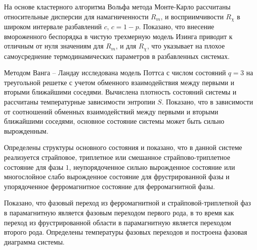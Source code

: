

На основе кластерного алгоритма Вольфа метода Монте-Карло рассчитаны относительные дисперсии для намагниченности $R_m$, и восприимчивости $R_\chi$ в широком интервале разбавлений $c$, $c=1-p$.
Показано, что внесение вмороженного беспорядка в чистую трехмерную модель Изинга приводит к отличным от нуля значениям для $R_m$, и для $R_\chi$, что указывает на плохое самоусреднение термодинамических параметров в разбавленных системах.


Методом Ванга -- Ландау исследована модель Поттса с числом состояний $q=3$ на треугольной решетке с учетом обменного взаимодействия между первыми и вторыми ближайшими соседями. Вычислена плотность состояний системы и рассчитаны температурные зависимости энтропии $S$. Показано, что в зависимости от соотношений обменных взаимодействий между первыми и вторыми ближайшими соседями, основное состояние системы может быть сильно вырожденным.

Определены структуры основного состояния и показано, что в данной системе реализуется страйповое, триплетное или смешанное страйпово-триплетное состояние для фазы $1$, неупорядоченное сильно вырожденное состояние или многослойное слабо вырожденное состояние для фрустрированной фазы и упорядоченное ферромагнитное состояние для ферромагнитной фазы.

Показано, что фазовый переход из ферромагнитной и страйповой-триплетной фаз в парамагнитную является фазовым переходом первого рода, в то время как переход из фрустрированной области в парамагнитную является переходом второго рода. Определены температуры фазовых переходов и построена фазовая диаграмма системы.











